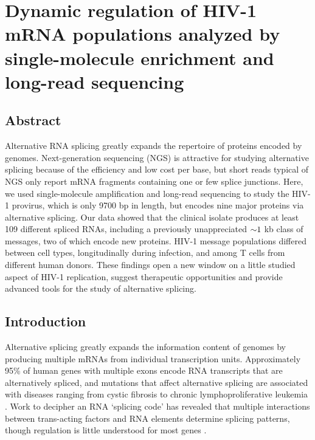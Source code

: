 \documentclass[../sherrill-Mix_thesis.tex]{subfiles}
\begin{document}
\graphicspath{{im/}{pacBio/im/}}

\chapter{Dynamic regulation of HIV-1 mRNA populations analyzed by single-molecule enrichment and long-read sequencing}
\label{chapPacBio}



\section{Abstract}
Alternative RNA splicing greatly expands the repertoire of proteins encoded by genomes. Next-generation sequencing (NGS) is attractive for studying alternative splicing because of the efficiency and low cost per base, but short reads typical of NGS only report mRNA fragments containing one or few splice junctions. Here, we used single-molecule amplification and long-read sequencing to study the HIV-1 provirus, which is only 9700 bp in length, but encodes nine major proteins via alternative splicing. Our data showed that the clinical isolate \hivEight{} produces at least 109 different spliced RNAs, including a previously unappreciated $\mathord{\sim}{}1$ kb class of messages, two of which encode new proteins. HIV-1 message populations differed between cell types, longitudinally during infection, and among T cells from different human donors. These findings open a new window on a little studied aspect of HIV-1 replication, suggest therapeutic opportunities and provide advanced tools for the study of alternative splicing. 

\section{Introduction}
Alternative splicing greatly expands the information content of genomes by producing multiple mRNAs from individual transcription units. Approximately 95\% of human genes with multiple exons encode RNA transcripts that are alternatively spliced, and mutations that affect alternative splicing are associated with diseases ranging from cystic fibrosis to chronic lymphoproliferative leukemia \citep{Pan2008,Wang2008,Pagani2005,Wang2007,Wang2011}. Work to decipher an RNA `splicing code' has revealed that multiple interactions between trans-acting factors and RNA elements determine splicing patterns, though regulation is little understood for most genes \citep{Barash2010}.
\end{document}

